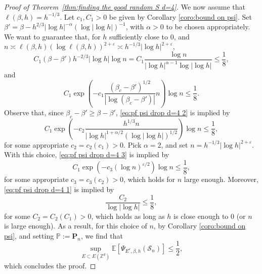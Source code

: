 \documentclass[11pt,a4paper]{article}
\numberwithin{equation}{section}
\theoremstyle{plain}
\theoremstyle{definition}
\begin{document}
\begin{proof}[Proof of Theorem~\textup{\ref{thm:finding the good random S d=4}}]
We now assume that $\ell(\beta,h)=h^{-1/3}$. Let $c_1,C_1>0$ be given by Corollary \ref{coro:bound on psi}. Set $\beta'=\beta-h^{2/3}|\log h|^{-\alpha}(\log |\log h|)^{-1}$, with $\alpha>0$ to be chosen appropriately. We want to guarantee that, for $h$ sufficiently close to $0$, and $n\asymp\ell(\beta,h)(\log \ell(\beta,h))^{2+\varepsilon}\asymp h^{-1/3}|\log h|^{2+\varepsilon}$,
\begin{equation}\label{eq:pf psi drop d=4 1}
	C_1(\beta-\beta')h^{-2/3}|\log h| \log n=C_1\frac{\log n}{|\log h|^{\alpha-1}\log |\log h|}\leq \frac{1}{8},
\end{equation}
and
\begin{equation}\label{eq:pf psi drop d=4 2}
	C_1\exp\left(-c_1\frac{(\beta_c-\beta')^{1/2}}{|\log (\beta_c-\beta')|}n\right)\log n\leq \frac{1}{8}.
\end{equation}
Observe that, since $\beta_c-\beta'\geq \beta-\beta'$, \eqref{eq:pf psi drop d=4 2} is implied by
\begin{equation}\label{eq:pf psi drop d=4 3}
C_1\exp\left(-c_2\frac{h^{1/3}n}{|\log h|^{1+\alpha/2}(\log |\log h|)^{1/2}} \right)\log n\leq \frac{1}{8},
\end{equation}
for some appropriate $c_2=c_2(c_1)>0$.
Pick $\alpha=2$, and set $n=h^{-1/3}|\log h|^{2+\varepsilon}$. With this choice, \eqref{eq:pf psi drop d=4 3} is implied by
\begin{equation}\label{eq: where eps becomes crucial}
	C_1\exp(-c_3 (\log n)^{\varepsilon/2})\log n\leq \frac{1}{8},
\end{equation}
for some appropriate $c_3=c_3(c_2)>0$,
which holds for $n$ large enough. Moreover, \eqref{eq:pf psi drop d=4 1} is implied by
\begin{equation}
	\frac{C_2}{\log |\log h|}\leq \frac{1}{8},
\end{equation}
for some $C_2=C_2(C_1)>0$, which holds as long as $h$ is close enough to $0$ (or $n$ is large enough). As a result, for this choice of $n$, by Corollary \ref{coro:bound on psi}, and setting $\mathbb P:=\mathbf P_n$, we find that
\begin{equation}
	\sup_{E\subset E(\mathbb Z^d)}\mathbb E[\Psi_{E^c,\beta,h}(\mathcal S_n)]\leq \frac{1}{2},
\end{equation}
	which concludes the proof.
\end{proof}
\end{document}
